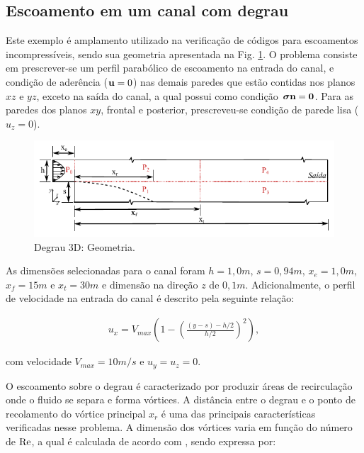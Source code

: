 \documentclass[tese_patricia]{subfiles}
\begin{document}
\subsection {Escoamento em um canal com degrau}

Este exemplo é amplamento utilizado na verificação de códigos para escoamentos incompressíveis, sendo sua geometria apresentada na Fig. \ref{fig:degrau_geo}.  O problema consiste em prescrever-se um perfil parabólico de escoamento na entrada do canal, e condição de aderência ($\mathbf{u} = 0$) nas demais paredes que estão contidas nos planos $xz$ e $yz$, exceto na saída do canal, a qual possui como condição $\boldsymbol{\sigma}\mathbf{n} = \mathbf{0}$. Para as paredes dos planos $xy$, frontal e posterior, prescreveu-se condição de parede lisa ($u_{z}=0$). 

\begin{figure}[htb!]
	\centering
	\includegraphics[scale=1.2,trim=0cm 0cm 0cm 0cm, clip=true]{Imagens/Cap2/degrau.pdf}
	\caption{Degrau 3D: Geometria.}
	\label{fig:degrau_geo}
\end{figure}


As dimensões selecionadas para o canal foram $h = 1,0m$, $s = 0,94m$, $x_{e}= 1,0m$, $x_{f}= 15m$ e $x_{t} = 30m$ e dimensão na direção $z$ de $0,1m$. Adicionalmente, o perfil de velocidade na entrada do canal é descrito pela seguinte relação:

\begin{align}
u_{x} = V_{max} \left(1-\left(\frac{\left(y-s\right)-h/2}{h/2}\right)^{2}\right),
\end{align}

\noindent com velocidade $V_{max} = 10 m/s$ e $u_{y} = u_{z} = 0$.

O escoamento sobre o degrau é caracterizado por produzir áreas de recirculação onde o fluido se separa e forma vórtices. A distância entre o degrau e o ponto de recolamento do vórtice principal $x_{r}$ é uma das principais características verificadas nesse problema. A dimensão dos vórtices varia em função do número de $\mathrm{Re}$, a qual é calculada de acordo com , sendo expressa por:
\end{document}
